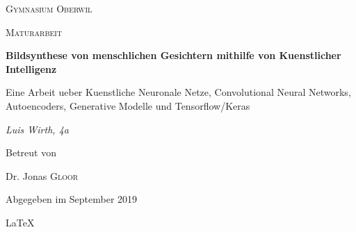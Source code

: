 \documentclass[../main]{subfiles}
\begin{document}
\begin{titlepage}
    \centering

    {\scshape\LARGE Gymnasium Oberwil\par}
    \vspace{1cm}
    {\scshape\Large Maturarbeit\par}
    \vspace{1.5cm}
    {\huge\bfseries Bildsynthese von menschlichen Gesichtern mithilfe von Kuenstlicher Intelligenz\par}
    \vspace{0.2cm}
    {\large Eine Arbeit ueber Kuenstliche Neuronale Netze, Convolutional Neural
      Networks, Autoencoders, Generative Modelle und Tensorflow/Keras \par}
    \vspace{2cm}
    {\Large\itshape Luis Wirth, 4a\par}
    \vfill
    Betreut von\par
    Dr. Jonas \textsc{Gloor}

    \vfill
    {\large Abgegeben im September 2019\par}
    \LaTeX{}
\end{titlepage}
\end{document}
